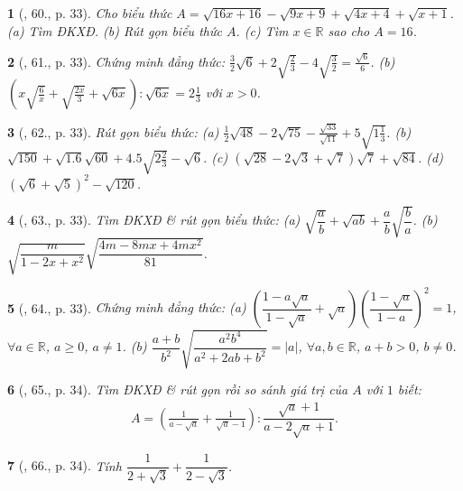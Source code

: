 \documentclass{article}
\newtheorem{baitoan}{}
\begin{document}
\begin{baitoan}[\cite{SGK_Toan_9_tap_1}, 60., p. 33]
	Cho biểu thức $A = \sqrt{16x + 16} - \sqrt{9x + 9} + \sqrt{4x + 4} + \sqrt{x + 1}$. (a) Tìm ĐKXĐ. (b) Rút gọn biểu thức $A$. (c) Tìm $x\in\mathbb{R}$ sao cho $A = 16$.
\end{baitoan}

\begin{baitoan}[\cite{SGK_Toan_9_tap_1}, 61., p. 33]
	Chứng minh đẳng thức: $\frac{3}{2}\sqrt{6} + 2\sqrt{\frac{2}{3}} - 4\sqrt{\frac{3}{2}} = \frac{\sqrt{6}}{6}$. (b) $\left(x\sqrt{\frac{6}{x}} + \sqrt{\frac{2x}{3}} + \sqrt{6x}\right):\sqrt{6x} = 2\frac{1}{3}$ với $x > 0$.
\end{baitoan}

\begin{baitoan}[\cite{SGK_Toan_9_tap_1}, 62., p. 33]
	Rút gọn biểu thức: (a) $\frac{1}{2}\sqrt{48} - 2\sqrt{75} - \frac{\sqrt{33}}{\sqrt{11}} + 5\sqrt{1\frac{1}{3}}$. (b) $\sqrt{150} + \sqrt{1.6}\sqrt{60} + 4.5\sqrt{2\frac{2}{3}} - \sqrt{6}$. (c) $(\sqrt{28} - 2\sqrt{3} + \sqrt{7})\sqrt{7} + \sqrt{84}$. (d) $(\sqrt{6} + \sqrt{5})^2 - \sqrt{120}$.
\end{baitoan}

\begin{baitoan}[\cite{SGK_Toan_9_tap_1}, 63., p. 33]
	Tìm ĐKXĐ \& rút gọn biểu thức: (a) $\sqrt{\dfrac{a}{b}} + \sqrt{ab} + \dfrac{a}{b}\sqrt{\dfrac{b}{a}}$. (b) $\sqrt{\dfrac{m}{1 - 2x + x^2}}\sqrt{\dfrac{4m - 8mx + 4mx^2}{81}}$.
\end{baitoan}

\begin{baitoan}[\cite{SGK_Toan_9_tap_1}, 64., p. 33]
	Chứng minh đẳng thức: (a) $\left(\dfrac{1 - a\sqrt{a}}{1 - \sqrt{a}} + \sqrt{a}\right)\left(\dfrac{1 - \sqrt{a}}{1 - a}\right)^2 = 1$, $\forall a\in\mathbb{R}$, $a\ge0$, $a\ne1$. (b) $\dfrac{a + b}{b^2}\sqrt{\dfrac{a^2b^4}{a^2 + 2ab + b^2}} = |a|$, $\forall a,b\in\mathbb{R}$, $a + b > 0$, $b\ne0$.
\end{baitoan}

\begin{baitoan}[\cite{SGK_Toan_9_tap_1}, 65., p. 34]
	Tìm ĐKXĐ \& rút gọn rồi so sánh giá trị của $A$ với $1$ biết:
	\begin{align*}
		A = \left(\frac{1}{a - \sqrt{a}} + \frac{1}{\sqrt{a} - 1}\right):\dfrac{\sqrt{a} + 1}{a - 2\sqrt{a} + 1}.
	\end{align*}
\end{baitoan}

\begin{baitoan}[\cite{SGK_Toan_9_tap_1}, 66., p. 34]
	Tính $\dfrac{1}{2 + \sqrt{3}} + \dfrac{1}{2 - \sqrt{3}}$.
\end{baitoan}
\end{document}
